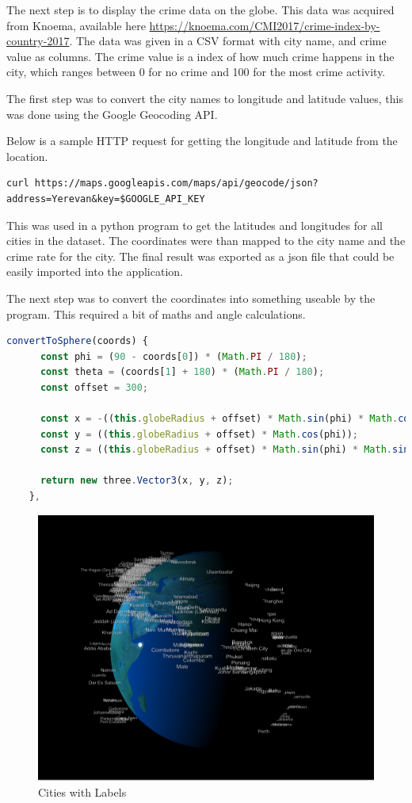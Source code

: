 \documentclass[]{article}
\begin{document}
The next step is to display the crime data on the globe.
This data was acquired from Knoema, available here \url{https://knoema.com/CMI2017/crime-index-by-country-2017}.
The data was given in a CSV format with city name, and crime value as columns.
The crime value is a index of how much crime happens in the city, which ranges between
0 for no crime and 100 for the most crime activity.

The first step was to convert the city names to longitude and latitude values,
this was done using the Google Geocoding API.

Below is a sample HTTP request for getting the longitude and latitude from the location.

\begin{verbatim}
curl https://maps.googleapis.com/maps/api/geocode/json?address=Yerevan&key=$GOOGLE_API_KEY
\end{verbatim}

This was used in a python program to get the latitudes and longitudes for all cities in the dataset.
The coordinates were than mapped to the city name and the crime rate for the city.
The final result was exported as a json file that could be easily imported into the application.

The next step was to convert the coordinates into something useable by the program.
This required a bit of maths and angle calculations.

\begin{lstlisting}[language=JavaScript]
    convertToSphere(coords) {
      const phi = (90 - coords[0]) * (Math.PI / 180);
      const theta = (coords[1] + 180) * (Math.PI / 180);
      const offset = 300;

      const x = -((this.globeRadius + offset) * Math.sin(phi) * Math.cos(theta));
      const y = ((this.globeRadius + offset) * Math.cos(phi));
      const z = ((this.globeRadius + offset) * Math.sin(phi) * Math.sin(theta));

      return new three.Vector3(x, y, z);
    },
\end{lstlisting}

\begin{figure}[H]
   \centering
   \includegraphics[width=0.8\linewidth]{images/city_labels}
   \caption{Cities with Labels}
   \label{fig:city_labels}
\end{figure}
\end{document}
